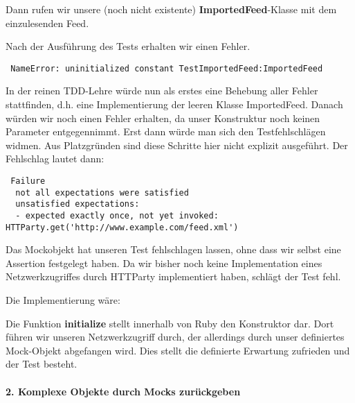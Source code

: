 Dann rufen wir unsere (noch nicht existente) \textbf{ImportedFeed}-Klasse mit dem einzulesenden Feed.
\tddred

Nach der Ausführung des Tests erhalten wir einen Fehler.
\begin{lstlisting}
 NameError: uninitialized constant TestImportedFeed:ImportedFeed
\end{lstlisting}
In der reinen TDD-Lehre würde nun als erstes eine Behebung aller Fehler stattfinden, d.h. eine Implementierung der leeren Klasse ImportedFeed. Danach würden wir noch einen Fehler erhalten, da unser Konstruktur noch keinen Parameter entgegennimmt. Erst dann würde man sich den Testfehlschlägen widmen. Aus Platzgründen sind diese Schritte hier nicht explizit ausgeführt. Der Fehlschlag lautet dann:

\begin{lstlisting}
 Failure
  not all expectations were satisfied
  unsatisfied expectations:
  - expected exactly once, not yet invoked: HTTParty.get('http://www.example.com/feed.xml')
\end{lstlisting}
Das Mockobjekt hat unseren Test fehlschlagen lassen, ohne dass wir selbst eine Assertion festgelegt haben. Da wir bisher noch keine Implementation eines Netzwerkzugriffes durch HTTParty implementiert haben, schlägt der Test fehl.

Die Implementierung wäre:
\begin{ruby}[label=lib/imported\_feed.rb]
 

 
   
\end{ruby}

\tddgreen
Die Funktion \textbf{initialize} stellt innerhalb von Ruby den Konstruktor dar. Dort führen wir unseren Netzwerkzugriff durch, der allerdings durch unser definiertes Mock-Objekt abgefangen wird. Dies stellt die definierte Erwartung zufrieden und der Test besteht.



\paragraph{2. Komplexe Objekte durch Mocks zurückgeben}

